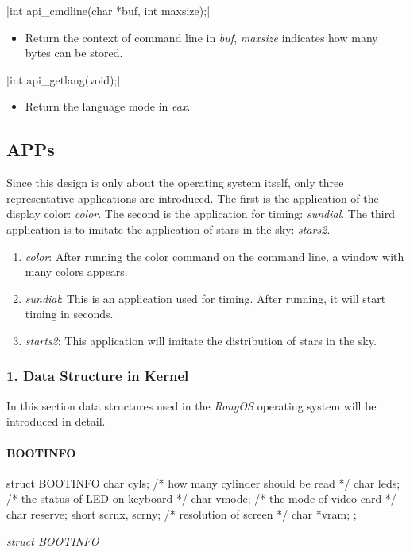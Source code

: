 \documentclass{swfcthesis}
\begin{document}
\csingle|int api_cmdline(char *buf, int maxsize);|
\begin{itemize}
\item Return the context of command line in \emph{buf}, \emph{maxsize} indicates how many
  bytes can be stored.
  
\end{itemize}

\csingle|int api_getlang(void);|
\begin{itemize}
\item Return the language mode in \emph{eax}.
\end{itemize}

\subsection{APPs}
\label{sec:apps-1}
Since this design is only about the operating system itself, only three representative
applications are introduced. The first is the application of the display color:
\emph{color}. The second is the application for timing: \emph{sundial}. The third
application is to imitate the application of stars in the sky: \emph{stars2}.

\begin{enumerate}
\item \emph{color}: After running the color command on the command line, a window with
  many colors appears.
\item \emph{sundial}: This is an application used for timing. After running, it will start
  timing in seconds.
\item \emph{starts2}: This application will imitate the distribution of stars in the sky.
  
\end{enumerate}

\iffalse %
\subsubsection{1. Data Structure in Kernel}
In this section data structures used in the \emph{RongOS} operating system will be introduced in
detail.

\paragraph{BOOTINFO}

\begin{listing}[H]
  \begin{codeblock}
\begin{ccode}
struct BOOTINFO
{
  char cyls;          /* how many cylinder should be read */
  char leds;          /* the status of LED on keyboard */
  char vmode;         /* the mode of video card */
  char reserve;
  short scrnx, scrny; /* resolution of screen */
  char *vram;
};
\end{ccode}
  \end{codeblock}
  \caption{\emph{struct BOOTINFO}}\label{src:bootinfo}
\end{listing}
\end{document}
